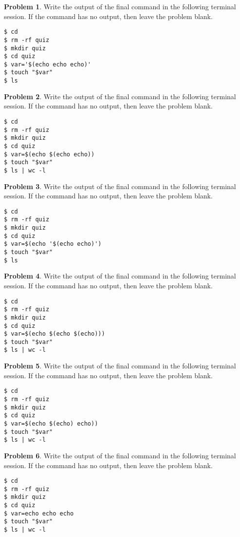 \documentclass[10pt]{article}
\theoremstyle{definition}
\newtheorem{problem}{Problem}
\begin{document}
\begin{problem}
    Write the output of the final command in the following terminal session.
    If the command has no output, then leave the problem blank.
\end{problem}
\begin{lstlisting}
$ cd
$ rm -rf quiz
$ mkdir quiz
$ cd quiz
$ var='$(echo echo echo)'
$ touch "$var"
$ ls
\end{lstlisting}
\vspace{0.4in}

\begin{problem}
    Write the output of the final command in the following terminal session.
    If the command has no output, then leave the problem blank.
\end{problem}
\begin{lstlisting}
$ cd
$ rm -rf quiz
$ mkdir quiz
$ cd quiz
$ var=$(echo $(echo echo))
$ touch "$var"
$ ls | wc -l
\end{lstlisting}
\vspace{0.4in}


\begin{problem}
    Write the output of the final command in the following terminal session.
    If the command has no output, then leave the problem blank.
\end{problem}
\begin{lstlisting}
$ cd
$ rm -rf quiz
$ mkdir quiz
$ cd quiz
$ var=$(echo '$(echo echo)')
$ touch "$var"
$ ls
\end{lstlisting}
\vspace{0.4in}

\begin{problem}
    Write the output of the final command in the following terminal session.
    If the command has no output, then leave the problem blank.
\end{problem}
\begin{lstlisting}
$ cd
$ rm -rf quiz
$ mkdir quiz
$ cd quiz
$ var=$(echo $(echo $(echo)))
$ touch "$var"
$ ls | wc -l
\end{lstlisting}
\vspace{0.4in}


\begin{problem}
    Write the output of the final command in the following terminal session.
    If the command has no output, then leave the problem blank.
\end{problem}
\begin{lstlisting}
$ cd
$ rm -rf quiz
$ mkdir quiz
$ cd quiz
$ var=$(echo $(echo) echo))
$ touch "$var"
$ ls | wc -l
\end{lstlisting}
\vspace{0.4in}
\begin{problem}
    Write the output of the final command in the following terminal session.
    If the command has no output, then leave the problem blank.
\end{problem}
\begin{lstlisting}
$ cd
$ rm -rf quiz
$ mkdir quiz
$ cd quiz
$ var=echo echo echo
$ touch "$var"
$ ls | wc -l
\end{lstlisting}
\vspace{0.4in}
\end{document}
